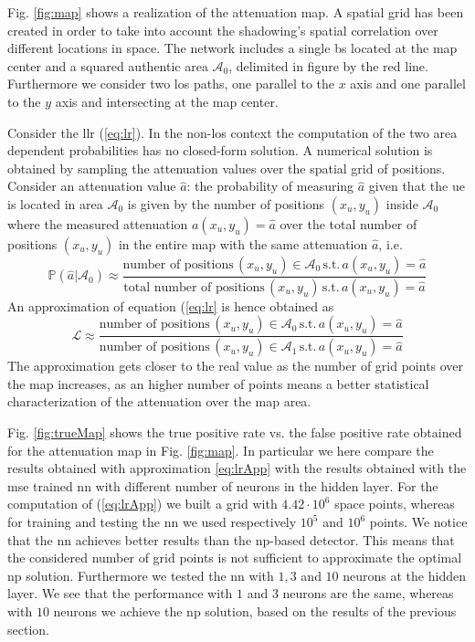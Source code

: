 \documentclass[draftcls,onecolumn,12pt]{IEEEtran}
\begin{document}
Fig. \ref{fig:map} shows a realization of the attenuation map. A spatial grid has been created in order to take into account the shadowing's spatial correlation over different locations in space. The network includes a single \ac{bs} located at the map center and a squared authentic area $\mathcal{A}_0$, delimited in figure by the red line. Furthermore we consider two \ac{los} paths, one parallel to the $x$ axis and one parallel to the $y$ axis and intersecting at the map center.

Consider the \ac{llr} (\ref{eq:lr}). In the non-\ac{los} context the computation of the two area dependent probabilities has no closed-form solution. A numerical solution is obtained by sampling the attenuation values over the spatial grid of positions. Consider an attenuation value $\hat{a}$: the probability of measuring $\hat{a}$ given that the \ac{ue} is located in area $\mathcal{A}_0$ is given by the number of positions $(x_u,y_u)$ inside $\mathcal{A}_0$ where the measured attenuation $a(x_u,y_u)=\hat{a}$ over the total number of positions $(x_u,y_u)$ in the entire map with the same attenuation $\hat{a}$, i.e.
\begin{equation}
    \mathbb{P}(\hat{a}|\mathcal{A}_0) \approx \frac{\text{number of positions} \, (x_u,y_u) \in \mathcal{A}_0 \, \text{s.t.} \, a(x_u,y_u) = \hat{a}}{\text{total number of positions} \, (x_u,y_u) \, \text{s.t.} \, a(x_u,y_u) = \hat{a}}
\end{equation}
An approximation of equation (\ref{eq:lr} is hence obtained as
\begin{equation}\label{eq:lrApp}
    \mathcal{L} \approx \frac{\text{number of positions} \, (x_u,y_u) \in \mathcal{A}_0 \, \text{s.t.} \, a(x_u,y_u) = \hat{a}}{\text{number of positions} \, (x_u,y_u) \in \mathcal{A}_1 \, \text{s.t.} \, a(x_u,y_u) = \hat{a}}
\end{equation}
The approximation gets closer to the real value as the number of grid points over the map increases, as an higher number of points means a better statistical characterization of the attenuation over the map area.

Fig. \ref{fig:trueMap} shows the true positive rate vs. the false positive rate obtained for the attenuation map in Fig. \ref{fig:map}. In particular we here compare the results obtained with approximation \ref{eq:lrApp} with the results obtained with the \ac{mse} trained \ac{nn} with different number of neurons in the hidden layer.
For the computation of (\ref{eq:lrApp}) we built a grid with $4.42 \cdot 10^6$ space points, whereas for training and testing the \ac{nn} we used respectively $10^5$ and $10^6$ points. We notice that the \ac{nn} achieves better results than the \ac{np}-based detector. This means that the considered number of grid points is not sufficient to approximate the optimal \ac{np} solution. Furthermore we tested the \ac{nn} with $1,3$ and $10$ neurons at the hidden layer. We see that the performance with $1$ and $3$ neurons are the same, whereas with $10$ neurons we achieve the \ac{np} solution, based on the results of the previous section. 
\end{document}
